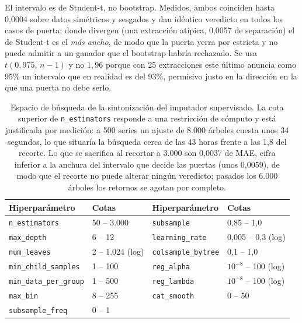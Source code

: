 El intervalo es de Student-t, no bootstrap. Medidos, ambos coinciden hasta 0{,}0004 sobre datos
simétricos y sesgados y dan idéntico veredicto en todos los casos de puerta; donde divergen (una
extracción atípica, 0{,}0057 de separación) el de Student-t es el \emph{más ancho}, de modo que
la puerta yerra por estricta y no puede admitir a un ganador que el bootstrap habría rechazado.
Se usa $t(0{,}975,\, n-1)$ y no $1{,}96$ porque con 25 extracciones este último anuncia como 95\%
un intervalo que en realidad es del 93\%, permisivo justo en la dirección en la que una puerta no
debe serlo.

\begin{table}[htbp]
    \centering
    \small
    \begin{tabular}{llll}
        \toprule
        \textbf{Hiperparámetro} & \textbf{Cotas} & \textbf{Hiperparámetro} & \textbf{Cotas} \\
        \midrule
        \texttt{n\_estimators} & 50 -- 3.000 & \texttt{subsample} & 0,85 -- 1,0 \\
        \texttt{max\_depth} & 6 -- 12 & \texttt{learning\_rate} & 0,005 -- 0,3 (log) \\
        \texttt{num\_leaves} & 2 -- 1.024 (log) & \texttt{colsample\_bytree} & 0,1 -- 1,0 \\
        \texttt{min\_child\_samples} & 1 -- 100 & \texttt{reg\_alpha} & $10^{-8}$ -- 100 (log) \\
        \texttt{min\_data\_per\_group} & 1 -- 500 & \texttt{reg\_lambda} & $10^{-8}$ -- 100 (log) \\
        \texttt{max\_bin} & 8 -- 255 & \texttt{cat\_smooth} & 0 -- 50 \\
        \texttt{subsample\_freq} & 0 -- 1 & & \\
        \bottomrule
    \end{tabular}
    \caption[Espacio de búsqueda del imputador supervisado]{Espacio de búsqueda de la sintonización del imputador supervisado. La cota superior
    de \texttt{n\_estimators} responde a una restricción de cómputo y está justificada por
    medición: a 500 series un ajuste de 8.000 árboles cuesta unos 34 segundos, lo que situaría la
    búsqueda cerca de las 43 horas frente a las 1{,}8 del recorte. Lo que se sacrifica al recortar
    a 3.000 son 0{,}0037 de MAE, cifra inferior a la anchura del intervalo que decide las puertas
    (unos 0{,}0059), de modo que el recorte no puede alterar ningún veredicto; pasados los 6.000
    árboles los retornos se agotan por completo.}
    \label{tab:tuning_espacio}
\end{table}

